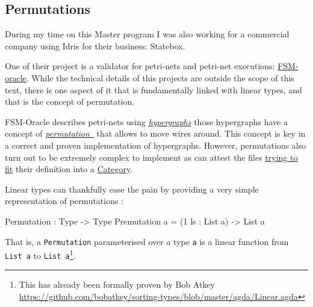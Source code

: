\documentclass[
]{article}
\newenvironment{Shaded}{}{}
\newcommand{\DataTypeTok}[1]{\textcolor[rgb]{0.56,0.13,0.00}{#1}}
\newcommand{\DecValTok}[1]{\textcolor[rgb]{0.25,0.63,0.44}{#1}}
\newcommand{\NormalTok}[1]{#1}
\newcommand{\OperatorTok}[1]{\textcolor[rgb]{0.40,0.40,0.40}{#1}}
\newcommand{\OtherTok}[1]{\textcolor[rgb]{0.00,0.44,0.13}{#1}}
\begin{document}
\hypertarget{permutations}{%
\subsection{Permutations}\label{permutations}}

During my time on this Master program I was also working for a
commercial company using Idris for their business: Statebox.

One of their project is a validator for petri-nets and petri-net
executions: \href{https://github.com/statebox/fsm-oracle}{FSM-oracle}.
While the technical details of this projects are outside the scope of
this text, there is one aspect of it that is fundamentally linked with
linear types, and that is the concept of permutation.

FSM-Oracle describes petri-nets using
\href{http://www.zanasi.com/fabio/files/paperCALCO19b.pdf}{\emph{hypergraphs}}
\cite{cartographer} those hypergraphs have a concept of
\href{https://github.com/statebox/fsm-oracle/blob/master/src/Permutations/Permutations.idr\#L31}{\emph{permutation}~}
that allows to move wires around. This concept is key in a correct and
proven implementation of hypergraphs. However, permutations also turn
out to be extremely complex to implement as can attest the files
\href{https://github.com/statebox/fsm-oracle/blob/master/src/Permutations/PermutationsCategory.idr}{trying
to fit} their definition into a
\href{https://github.com/statebox/fsm-oracle/blob/master/src/Permutations/PermutationsStrictMonoidalCategory.idr}{Category}.

Linear types can thankfully ease the pain by providing a very simple
representation of permutations :

\begin{Shaded}
\begin{Highlighting}[]
\DataTypeTok{Permutation} \OperatorTok{:} \DataTypeTok{Type} \OtherTok{{-}\textgreater{}} \DataTypeTok{Type}
\DataTypeTok{Premutation}\NormalTok{ a }\OtherTok{=}\NormalTok{ (}\DecValTok{1}\NormalTok{ ls }\OperatorTok{:} \DataTypeTok{List}\NormalTok{ a) }\OtherTok{{-}\textgreater{}} \DataTypeTok{List}\NormalTok{ a}
\end{Highlighting}
\end{Shaded}

That is, a \texttt{Permutation} parameterised over a type \texttt{a} is
a linear function from \texttt{List\ a} to \texttt{List\ a}\footnote{This
  has already been formally proven by Bob Atkey
  \url{https://github.com/bobatkey/sorting-types/blob/master/agda/Linear.agda}}.
\end{document}
